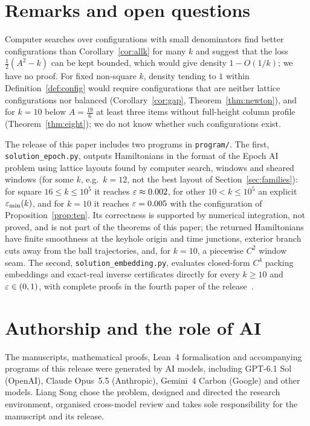 \documentclass[11pt]{amsart}
\begin{document}
\section{Remarks and open questions}\label{sec:remarks}

Computer searches over configurations with small denominators find better configurations than
Corollary~\ref{cor:allk} for many $k$ and suggest that the loss $\frac12(A^2-k)$ can be kept bounded, which would
give density $1-O(1/k)$; we have no proof. For fixed non-square $k$, density tending to $1$ within
Definition~\ref{def:config} would require configurations that are neither lattice configurations nor balanced
(Corollary~\ref{cor:gap}, Theorem~\ref{thm:newton}), and for $k=10$ below $A=\frac{19}6$ at least three items
without full-height column profile (Theorem~\ref{thm:eight}); we do not know whether such configurations exist.

\begin{remark}\label{rem:program}
The release of this paper includes two programs in \texttt{program/}. The first, \texttt{solution\_epoch.py}, outputs
Hamiltonians in the format of the Epoch AI problem \cite{Epoch} using lattice layouts found by computer search, windows
and sheared windows (for some $k$, e.g.\ $k=12$, not the best layout of Section~\ref{sec:families}): for square
$16\le k\le10^5$ it reaches $\varepsilon\approx0.002$, for other $10<k\le10^5$ an explicit $\varepsilon_{\min}(k)$, and for
$k=10$ it reaches $\varepsilon=0.005$ with the configuration of Proposition~\ref{prop:ten}. Its correctness is supported by
numerical integration, not proved, and is not part of the theorems of this paper; the returned Hamiltonians have
finite smoothness at the keyhole origin and time junctions, exterior branch cuts away from the ball trajectories, and,
for $k=10$, a piecewise $C^2$ window seam. The second,
\texttt{solution\_embedding.py}, evaluates closed-form $C^4$ packing embeddings and exact-real inverse certificates
directly for every $k\ge10$ and $\varepsilon\in(0,1)$, with complete proofs in the fourth paper of the release~\cite{SongP4}.
\end{remark}

\section*{Authorship and the role of AI}

The manuscripts, mathematical proofs, Lean~4 formalisation and accompanying programs of this release were generated by
AI models, including GPT-6.1 Sol (OpenAI), Claude Opus~5.5 (Anthropic), Gemini~4 Carbon (Google) and other models.
Liang Song chose the problem, designed and directed the research environment, organised cross-model review and takes
sole responsibility for the manuscript and its release.
\end{document}
